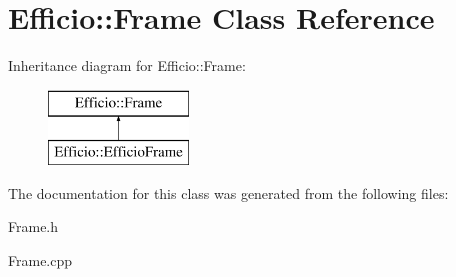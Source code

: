 \hypertarget{class_efficio_1_1_frame}{}\section{Efficio\+:\+:Frame Class Reference}
\label{class_efficio_1_1_frame}
Inheritance diagram for Efficio\+:\+:Frame\+:\begin{figure}[H]
\begin{center}
\leavevmode
\includegraphics[height=2.000000cm]{class_efficio_1_1_frame}
\end{center}
\end{figure}


The documentation for this class was generated from the following files\+:\begin{DoxyCompactItemize}
\item 
Frame.\+h\item 
Frame.\+cpp\end{DoxyCompactItemize}
